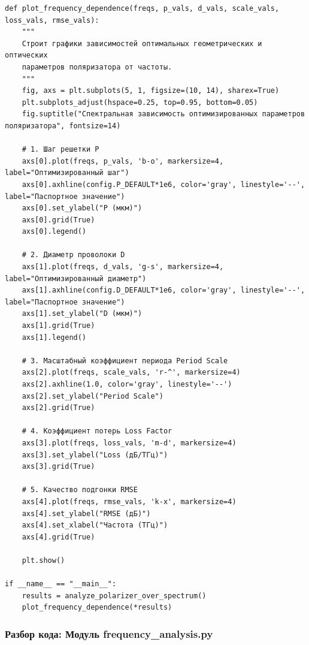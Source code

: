 \begin{listing}[H]
	\caption{Визуализация результатов спектрального анализа ()}
\begin{verbatim}
def plot_frequency_dependence(freqs, p_vals, d_vals, scale_vals, loss_vals, rmse_vals):
    """
    Строит графики зависимостей оптимальных геометрических и оптических 
    параметров поляризатора от частоты.
    """
    fig, axs = plt.subplots(5, 1, figsize=(10, 14), sharex=True)
    plt.subplots_adjust(hspace=0.25, top=0.95, bottom=0.05)
    fig.suptitle("Спектральная зависимость оптимизированных параметров поляризатора", fontsize=14)
    
    # 1. Шаг решетки P
    axs[0].plot(freqs, p_vals, 'b-o', markersize=4, label="Оптимизированный шаг")
    axs[0].axhline(config.P_DEFAULT*1e6, color='gray', linestyle='--', label="Паспортное значение")
    axs[0].set_ylabel("P (мкм)")
    axs[0].grid(True)
    axs[0].legend()
    
    # 2. Диаметр проволоки D
    axs[1].plot(freqs, d_vals, 'g-s', markersize=4, label="Оптимизированный диаметр")
    axs[1].axhline(config.D_DEFAULT*1e6, color='gray', linestyle='--', label="Паспортное значение")
    axs[1].set_ylabel("D (мкм)")
    axs[1].grid(True)
    axs[1].legend()
    
    # 3. Масштабный коэффициент периода Period Scale
    axs[2].plot(freqs, scale_vals, 'r-^', markersize=4)
    axs[2].axhline(1.0, color='gray', linestyle='--')
    axs[2].set_ylabel("Period Scale")
    axs[2].grid(True)
    
    # 4. Коэффициент потерь Loss Factor
    axs[3].plot(freqs, loss_vals, 'm-d', markersize=4)
    axs[3].set_ylabel("Loss (дБ/ТГц)")
    axs[3].grid(True)
    
    # 5. Качество подгонки RMSE
    axs[4].plot(freqs, rmse_vals, 'k-x', markersize=4)
    axs[4].set_ylabel("RMSE (дБ)")
    axs[4].set_xlabel("Частота (ТГц)")
    axs[4].grid(True)
    
    plt.show()

if __name__ == "__main__":
    results = analyze_polarizer_over_spectrum()
    plot_frequency_dependence(*results)
\end{verbatim}
\end{listing}

\subsubsection{Разбор кода: Модуль frequency\_analysis.py}

